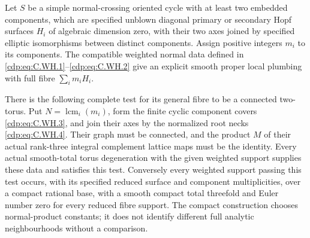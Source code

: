 \begin{proposition}\label{cdp:st:C.2.UN.52}

Let $S$ be a simple normal-crossing oriented cycle
with at least two embedded components, which are specified unblown
diagonal primary or secondary Hopf surfaces $H_i$
of algebraic dimension zero, with their two axes
joined by specified elliptic isomorphisms between distinct components.
Assign positive integers $m_i$ to its components.
The compatible weighted normal data defined in
\eqref{cdp:eq:C.WH.1}--\eqref{cdp:eq:C.WH.2} give an explicit smooth proper
local plumbing with full fibre $\sum_i m_iH_i$.

There is the following complete test for its
general fibre to be a connected two-torus.
Put $N=\operatorname{lcm}_i(m_i)$, form the finite
cyclic component covers \eqref{cdp:eq:C.WH.3}, and join their
axes by the normalized root necks \eqref{cdp:eq:C.WH.4}.
Their graph must be connected, and the product
$M$ of their actual rank-three integral complement
lattice maps must be the identity. Every actual
smooth-total torus degeneration with the given
weighted support supplies these data and satisfies
this test. Conversely every weighted support
passing this test occurs, with its specified
reduced surface and component multiplicities,
over a compact rational base, with a smooth
compact total threefold and Euler number zero
for every reduced fibre support. The compact
construction chooses normal-product constants;
it does not identify different full analytic
neighbourhoods without a comparison.


\end{proposition}
